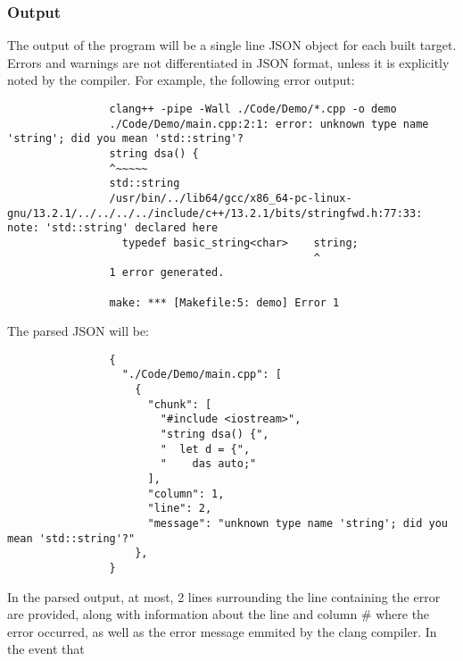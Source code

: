\documentclass{article}
\begin{document}
		\subsubsection{Output}
			The output of the program will be a single line JSON object for each built target. Errors and warnings are not differentiated in JSON format, unless it is explicitly noted by the compiler. For example, the following error output:
			\begin{verbatim}
				clang++ -pipe -Wall ./Code/Demo/*.cpp -o demo
				./Code/Demo/main.cpp:2:1: error: unknown type name 'string'; did you mean 'std::string'?
				string dsa() {
				^~~~~~
				std::string
				/usr/bin/../lib64/gcc/x86_64-pc-linux-gnu/13.2.1/../../../../include/c++/13.2.1/bits/stringfwd.h:77:33: note: 'std::string' declared here
				  typedef basic_string<char>    string;   
				                                ^
				1 error generated.

				make: *** [Makefile:5: demo] Error 1
			\end{verbatim}
			The parsed JSON will be:
			\begin{verbatim}
				{
				  "./Code/Demo/main.cpp": [
				    {
				      "chunk": [
				        "#include <iostream>",
				        "string dsa() {",
				        "  let d = {",
				        "    das auto;"
				      ],
				      "column": 1,
				      "line": 2,
				      "message": "unknown type name 'string'; did you mean 'std::string'?"
				    },
				}
			\end{verbatim}
			In the parsed output, at most, 2 lines surrounding the line containing the error are provided, along with information about the line and column \# where the error occurred, as well as the error message emmited by the clang compiler.
			In the event that 
\end{document}
